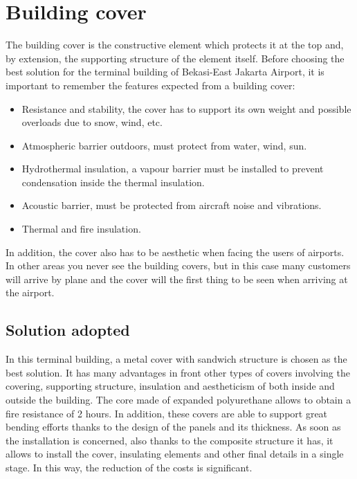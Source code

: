 \chapter{Building cover}

The building cover is the constructive element which protects it at the top and, by extension, the supporting structure of the element itself. Before choosing the best solution for the terminal building of Bekasi-East Jakarta Airport, it is important to remember the features expected from a building cover:

\begin{itemize}
	\item Resistance and stability, the cover has to support its own weight and possible overloads due to snow, wind, etc.
	\item Atmospheric barrier outdoors, must protect from water, wind, sun.
	\item Hydrothermal insulation, a vapour barrier must be installed to prevent condensation inside the thermal insulation.
	\item Acoustic barrier, must be protected from aircraft noise and vibrations.
	\item Thermal and fire insulation.
\end{itemize}

In addition, the cover also has to be aesthetic when facing the users of airports. In other areas you never see the building covers, but in this case many customers will arrive by plane and the cover will the first thing to be seen when arriving at the airport.

	\section{Solution adopted}
In this terminal building, a metal cover with sandwich structure is chosen as the best solution. It has many advantages in front other types of covers involving the covering, supporting structure, insulation and aestheticism of both inside and outside the building. The core made of expanded polyurethane allows to obtain a fire resistance of 2 hours. In addition, these covers are able to support great bending efforts thanks to the design of the panels and its thickness. As soon as the installation is concerned, also thanks to the composite structure it has, it allows to install the cover, insulating elements and other final details in a single stage. In this way, the reduction of the costs is significant.
	
